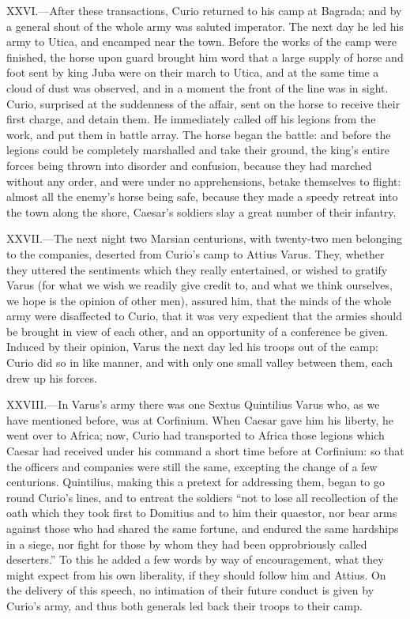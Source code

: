 XXVI.—After these transactions, Curio returned to his camp at Bagrada;
and by a general shout of the whole army was saluted imperator. The next
day he led his army to Utica, and encamped near the town. Before the
works of the camp were finished, the horse upon guard brought him word
that a large supply of horse and foot sent by king Juba were on their
march to Utica, and at the same time a cloud of dust was observed, and
in a moment the front of the line was in sight. Curio, surprised at the
suddenness of the affair, sent on the horse to receive their first
charge, and detain them. He immediately called off his legions from the
work, and put them in battle array. The horse began the battle: and
before the legions could be completely marshalled and take their ground,
the king's entire forces being thrown into disorder and confusion,
because they had marched without any order, and were under no
apprehensions, betake themselves to flight: almost all the enemy's horse
being safe, because they made a speedy retreat into the town along the
shore, Caesar's soldiers slay a great number of their infantry.

XXVII.—The next night two Marsian centurions, with twenty-two men
belonging to the companies, deserted from Curio's camp to Attius Varus.
They, whether they uttered the sentiments which they really entertained,
or wished to gratify Varus (for what we wish we readily give credit to,
and what we think ourselves, we hope is the opinion of other men),
assured him, that the minds of the whole army were disaffected to Curio,
that it was very expedient that the armies should be brought in view of
each other, and an opportunity of a conference be given. Induced by
their opinion, Varus the next day led his troops out of the camp: Curio
did so in like manner, and with only one small valley between them, each
drew up his forces.

XXVIII.—In Varus's army there was one Sextus Quintilius Varus who, as
we have mentioned before, was at Corfinium. When Caesar gave him his
liberty, he went over to Africa; now, Curio had transported to Africa
those legions which Caesar had received under his command a short time
before at Corfinium: so that the officers and companies were still the
same, excepting the change of a few centurions. Quintilius, making this
a pretext for addressing them, began to go round Curio's lines, and to
entreat the soldiers ``not to lose all recollection of the oath which
they took first to Domitius and to him their quaestor, nor bear arms
against those who had shared the same fortune, and endured the same
hardships in a siege, nor fight for those by whom they had been
opprobriously called deserters.'' To this he added a few words by way of
encouragement, what they might expect from his own liberality, if they
should follow him and Attius. On the delivery of this speech, no
intimation of their future conduct is given by Curio's army, and thus
both generals led back their troops to their camp.

